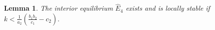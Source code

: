 \documentclass[10pt]{amsart}
\newtheorem{theorem}{Theorem}[section]
\newtheorem{lemma}[theorem]{Lemma}
\theoremstyle{definition}
\begin{document}



\begin{lemma}\label{lem:co_ode_1}
The interior equilibrium $\widehat{E}_4$ exists and is locally stable if 
$k < \frac{1}{a_{2}} \left(\frac{b_{1}b_{2}}{c_{1}} - c_{2}\right).$
\end{lemma}



%	
\end{document}
